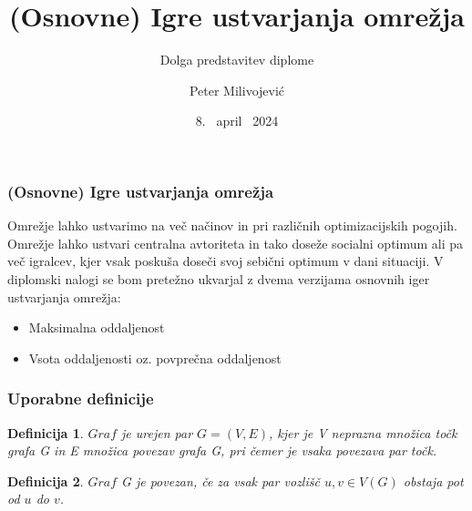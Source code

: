\documentclass[12pt, hyperref={unicode}]{beamer}
\title{(Osnovne) Igre ustvarjanja omrežja}
\subtitle{Dolga predstavitev diplome}
\author{Peter Milivojević}
\institute[FMF]{Fakulteta za matematiko in fiziko}
\date{8. \ april \ 2024}
\newtheorem{definicija}{Definicija}
\begin{document}
\begin{frame}
    \titlepage
\end{frame}


\begin{frame}
   
  \frametitle{(Osnovne) Igre ustvarjanja omrežja}
  Omrežje lahko ustvarimo na več načinov in pri različnih optimizacijskih pogojih.
  Omrežje lahko ustvari centralna avtoriteta in tako doseže socialni optimum ali pa
  več igralcev, kjer vsak poskuša doseči svoj sebični optimum v dani situaciji.
  V diplomski nalogi se bom pretežno ukvarjal z dvema verzijama osnovnih iger ustvarjanja omrežja:
  \vspace{1mm}
  \begin{itemize}
    \item Maksimalna oddaljenost
    \item Vsota oddaljenosti oz. povprečna oddaljenost
  \end{itemize}

\end{frame}

\begin{frame}
   
    \frametitle{Uporabne definicije}
    \begin{definicija}
    $Graf$ je urejen par $G = (V, E)$, kjer je V neprazna množica točk grafa G in E množica povezav grafa G, pri čemer je vsaka povezava par točk.
    \end{definicija}

    \begin{definicija}
    $Graf$ G je povezan, če za vsak par vozlišč $u, v \in V(G)$ obstaja pot od $u$ do $v$.
    \end{definicija}

\end{frame}
\end{document}
